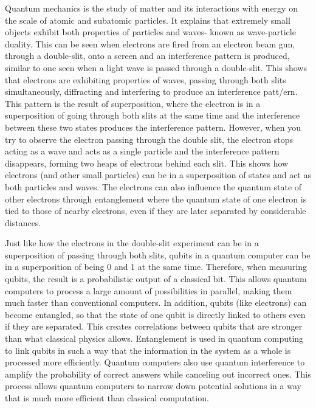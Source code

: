 \documentclass{article}
\begin{document}
   Quantum mechanics is the study of matter and its interactions with energy on
   the scale of atomic and subatomic particles. It explains that extremely
   small objects exhibit both properties of particles and waves- known as
   wave-particle duality. This can be seen when electrons are fired from an
   electron beam gun, through a double-slit, onto a screen and an interference
   pattern is produced, similar to one seen when a light wave is passed through
   a double-slit. This shows that electrons are exhibiting properties of waves,
   passing through both slits simultaneously, diffracting and interfering to
   produce an interference patt/ern. This pattern is the result of
   superposition, where the electron is in a superposition of going through
   both slits at the same time and the interference between these two states
   produces the interference pattern. However, when you try to observe the
   electron passing through the double slit, the electron stops acting as a
   wave and acts as a single particle and the interference pattern disappears,
   forming two heaps of electrons behind each slit. This shows how electrons
   (and other small particles) can be in a superposition of states and act as
   both particles and waves. The electrons can also influence the quantum state
   of other electrons through entanglement where  the quantum state of one
   electron is tied to those of nearby electrons, even if they are later
   separated by considerable distances.
   \medskip

   Just like how the electrons in the double-slit experiment can be in a
   superposition of passing through both slits, qubits in a quantum computer
   can be in a superposition of being 0 and 1 at the same time. Therefore, when
   measuring qubits, the result is a probabilistic output of a classical bit.
   This allows quantum computers to process a large amount of possibilities in
   parallel, making them much faster than conventional computers. In addition,
   qubits (like electrons) can become entangled, so that the state of one qubit
   is directly linked to others even if they are separated. This creates
   correlations between qubits that are stronger than what classical physics
   allows. Entanglement is used in quantum computing to link qubits in such a
   way that the information in the system as a whole is processed more
   efficiently. Quantum computers also use quantum interference to amplify the
   probability of correct answers while canceling out incorrect ones. This
   process allows quantum computers to narrow down potential solutions in a way
   that is much more efficient than classical computation.
   \medskip
\end{document}
